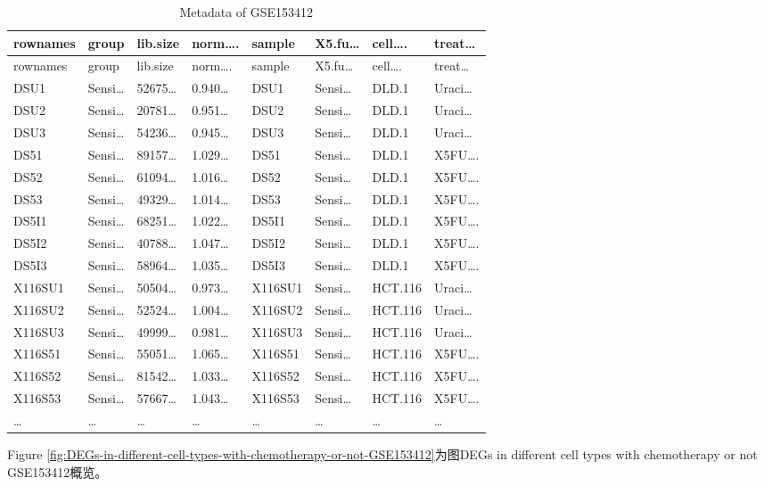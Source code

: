 \documentclass[
]{article}
\begin{document}
\begin{longtable}[]{@{}llllllll@{}}
\caption{\label{tab:metadata-of-GSE153412}Metadata of GSE153412}\tabularnewline
\toprule
rownames & group & lib.size & norm\ldots. & sample & X5.fu\ldots{} & cell\ldots. & treat\ldots{}\tabularnewline
\midrule
\endfirsthead
\toprule
rownames & group & lib.size & norm\ldots. & sample & X5.fu\ldots{} & cell\ldots. & treat\ldots{}\tabularnewline
\midrule
\endhead
DSU1 & Sensi\ldots{} & 52675\ldots{} & 0.940\ldots{} & DSU1 & Sensi\ldots{} & DLD.1 & Uraci\ldots{}\tabularnewline
DSU2 & Sensi\ldots{} & 20781\ldots{} & 0.951\ldots{} & DSU2 & Sensi\ldots{} & DLD.1 & Uraci\ldots{}\tabularnewline
DSU3 & Sensi\ldots{} & 54236\ldots{} & 0.945\ldots{} & DSU3 & Sensi\ldots{} & DLD.1 & Uraci\ldots{}\tabularnewline
DS51 & Sensi\ldots{} & 89157\ldots{} & 1.029\ldots{} & DS51 & Sensi\ldots{} & DLD.1 & X5FU\ldots.\tabularnewline
DS52 & Sensi\ldots{} & 61094\ldots{} & 1.016\ldots{} & DS52 & Sensi\ldots{} & DLD.1 & X5FU\ldots.\tabularnewline
DS53 & Sensi\ldots{} & 49329\ldots{} & 1.014\ldots{} & DS53 & Sensi\ldots{} & DLD.1 & X5FU\ldots.\tabularnewline
DS5I1 & Sensi\ldots{} & 68251\ldots{} & 1.022\ldots{} & DS5I1 & Sensi\ldots{} & DLD.1 & X5FU\ldots.\tabularnewline
DS5I2 & Sensi\ldots{} & 40788\ldots{} & 1.047\ldots{} & DS5I2 & Sensi\ldots{} & DLD.1 & X5FU\ldots.\tabularnewline
DS5I3 & Sensi\ldots{} & 58964\ldots{} & 1.035\ldots{} & DS5I3 & Sensi\ldots{} & DLD.1 & X5FU\ldots.\tabularnewline
X116SU1 & Sensi\ldots{} & 50504\ldots{} & 0.973\ldots{} & X116SU1 & Sensi\ldots{} & HCT.116 & Uraci\ldots{}\tabularnewline
X116SU2 & Sensi\ldots{} & 52524\ldots{} & 1.004\ldots{} & X116SU2 & Sensi\ldots{} & HCT.116 & Uraci\ldots{}\tabularnewline
X116SU3 & Sensi\ldots{} & 49999\ldots{} & 0.981\ldots{} & X116SU3 & Sensi\ldots{} & HCT.116 & Uraci\ldots{}\tabularnewline
X116S51 & Sensi\ldots{} & 55051\ldots{} & 1.065\ldots{} & X116S51 & Sensi\ldots{} & HCT.116 & X5FU\ldots.\tabularnewline
X116S52 & Sensi\ldots{} & 81542\ldots{} & 1.033\ldots{} & X116S52 & Sensi\ldots{} & HCT.116 & X5FU\ldots.\tabularnewline
X116S53 & Sensi\ldots{} & 57667\ldots{} & 1.043\ldots{} & X116S53 & Sensi\ldots{} & HCT.116 & X5FU\ldots.\tabularnewline
\ldots{} & \ldots{} & \ldots{} & \ldots{} & \ldots{} & \ldots{} & \ldots{} & \ldots{}\tabularnewline
\bottomrule
\end{longtable}

Figure \ref{fig:DEGs-in-different-cell-types-with-chemotherapy-or-not-GSE153412}为图DEGs in different cell types with chemotherapy or not GSE153412概览。
\end{document}
